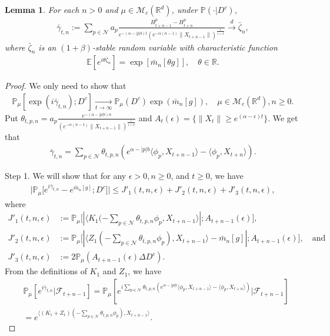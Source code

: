 \documentclass[12pt,a4paper]{amsart}
\theoremstyle{plain}
\newtheorem{lem}[thm]{Lemma}
\theoremstyle{definition}
\numberwithin{equation}{section}
\begin{document}
\begin{lem}
    For each $n>0$ and $\mu\in\mathcal{M}_c(\mathbb{R}^d)$, under $\mathbb{P}(\cdot|D^c)$,
    \begin{align}
        \bar{\gamma}_{t,n}:=\sum_{p\in\mathcal{N}}a_p\frac{H^p_{t+n-1}-H^p_{t+n}}{e^{-(\alpha-|p|b)t}(e^{-\alpha(n-1)}\|X_{t+n-1}\|)^{\frac{1}{1+\beta}}}\xrightarrow{d}\bar{\zeta}_n,
    \end{align}
    where $\bar{\zeta}_n$ is an $(1+\beta)$-stable random variable with characteristic function
    \begin{align}
        \mathbb{E}[e^{i\theta \bar{\zeta}_n}]=\exp[\bar{m}_n[\theta g]],\quad \theta\in \mathbb{R}.
    \end{align}
\end{lem}
\begin{proof}
We only need to show that
\begin{align}
    \mathbb{P}_{\mu}[\exp(i\bar{\gamma}_{t,n}); D^c]
    \xrightarrow[t\rightarrow \infty]{}\mathbb{P}_{\mu}(D^c)\exp(\bar{m}_n[g]),
    \quad \mu \in \mathcal M_c(\mathbb R^d), n \geq 0.
\end{align}
Put
$\theta_{t,p,n}=a_p\frac{e^{-(\alpha-|p|b)n}}{(e^{-\alpha(n-1)}\|X_{t+n-1}\|)^{\frac{1}{1+\beta}}}$ and $A_t(\epsilon)=\{\|X_t\|\geq e^{(\alpha-\epsilon)t}\}$.
We get that
\begin{align}
    \bar{\gamma}_{t,n}=\sum_{p\in \mathcal{N}}\theta_{t,p,n}(e^{\alpha-|p|b}\langle \phi_p, X_{t+n-1}\rangle-\langle \phi_p, X_{t+n}\rangle).
\end{align}

	Step 1. We will show that for any $\epsilon > 0, n\geq 0$, and $t\geq 0$, we have
\begin{align}
    \big|\mathbb{P}_{\mu}\big[e^{i\bar{\gamma}_{t,n}}-e^{\bar{m}_n[g]}; D^c\big]\big|
    \leq J'_1(t,n,\epsilon)+J'_2(t,n,\epsilon)+J'_3(t,n,\epsilon),
\end{align}
	where
\begin{align}
\label{eq: Def of JJ1}
	J'_1(t,n,\epsilon)
	&:= \mathbb{P}_{\mu}\big[|\langle K_1(-\sum_{p\in \mathcal{N}}\theta_{t,p,n}\phi_p, X_{t+n-1}\rangle|; A_{t+n-1}(\epsilon) \big],
	\\ J'_2(t,n,\epsilon)
	&:= \mathbb{P}_{\mu}\big[|\langle Z_1(-\sum_{p\in \mathcal{N}}\theta_{t,p,n}\phi_p),X_{t+n-1}\rangle-\bar{m}_n[g]|; A_{t+n-1}(\epsilon)\big],\quad\mbox{and}
	\\ J'_3(t,n, \epsilon)
	&:=2\mathbb{P}_{\mu}(A_{t+n-1}(\epsilon)\Delta D^c).
\end{align}
 From the definitions of $K_1$ and $Z_1$, we have
\begin{align}
\label{eq: need11}
    &\displaystyle\mathbb{P}_{\mu}[e^{i\bar{\gamma}_{t,n}}|\mathscr{F}_{t+n-1}]
    =\mathbb{P}_{\mu}[e^{i\sum_{p\in \mathcal{N}}\theta_{t,p,n}(e^{\alpha-|p|b}\langle \phi_p,X_{t+n-1}\rangle-\langle \phi_p, X_{t+n}\rangle)}|\mathscr{F}_{t+n-1}]
    \\&=\displaystyle e^{\langle (K_1+Z_1)(-\sum_{p\in \mathcal{N}}\theta_{t,p,n}\phi_p), X_{t+n-1} \rangle}.
\end{align}


\end{proof}
\end{document}
